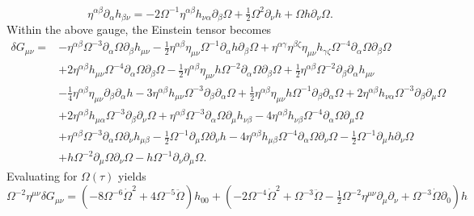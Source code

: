 \documentclass[10pt,letterpaper]{article}
\begin{document}
\begin{equation}
	\eta^{\alpha\beta}\partial_{\alpha}h_{\beta\nu} = -2 \Omega^{-1}  \eta^{\alpha\beta}h_{\nu\alpha}\partial_\beta \Omega + \tfrac12\Omega^2 \partial_\nu h +  \Omega h \partial_\nu \Omega.
\end{equation}
Within the above gauge, the Einstein tensor becomes
\begin{align}
\delta G_{\mu\nu}={}&- \eta^{\alpha \beta} \Omega^{-3} \partial_{\alpha}\Omega \partial_{\beta}h_{\mu \nu}
 -  \tfrac{1}{2} \eta^{\alpha \beta} \eta_{\mu \nu} \Omega^{-1} \partial_{\alpha}h \partial_{\beta}\Omega
 + \eta^{\alpha \gamma} \eta^{\beta \zeta} \eta_{\mu \nu} h_{\gamma \zeta} \Omega^{-4} \partial_{\alpha}\Omega \partial_{\beta}\Omega\nonumber\\
& + 2 \eta^{\alpha \beta} h_{\mu \nu} \Omega^{-4} \partial_{\alpha}\Omega \partial_{\beta}\Omega
 -  \tfrac{1}{2} \eta^{\alpha \beta} \eta_{\mu \nu} h \Omega^{-2} \partial_{\alpha}\Omega \partial_{\beta}\Omega
 + \tfrac{1}{2} \eta^{\alpha \beta} \Omega^{-2} \partial_{\beta}\partial_{\alpha}h_{\mu \nu}\nonumber\\
& -  \tfrac{1}{4} \eta^{\alpha \beta} \eta_{\mu \nu} \partial_{\beta}\partial_{\alpha}h
 - 3 \eta^{\alpha \beta} h_{\mu \nu} \Omega^{-3} \partial_{\beta}\partial_{\alpha}\Omega
 + \tfrac{1}{2} \eta^{\alpha \beta} \eta_{\mu \nu} h \Omega^{-1} \partial_{\beta}\partial_{\alpha}\Omega
 + 2 \eta^{\alpha \beta} h_{\nu \alpha} \Omega^{-3} \partial_{\beta}\partial_{\mu}\Omega\nonumber\\
& + 2 \eta^{\alpha \beta} h_{\mu \alpha} \Omega^{-3} \partial_{\beta}\partial_{\nu}\Omega
 + \eta^{\alpha \beta} \Omega^{-3} \partial_{\alpha}\Omega \partial_{\mu}h_{\nu \beta}
 - 4 \eta^{\alpha \beta} h_{\nu \beta} \Omega^{-4} \partial_{\alpha}\Omega \partial_{\mu}\Omega\nonumber\\
& + \eta^{\alpha \beta} \Omega^{-3} \partial_{\alpha}\Omega \partial_{\nu}h_{\mu \beta}
 -  \tfrac{1}{2} \Omega^{-1} \partial_{\mu}\Omega \partial_{\nu}h
 - 4 \eta^{\alpha \beta} h_{\mu \beta} \Omega^{-4} \partial_{\alpha}\Omega \partial_{\nu}\Omega
 -  \tfrac{1}{2} \Omega^{-1} \partial_{\mu}h \partial_{\nu}\Omega\nonumber\\
& + h \Omega^{-2} \partial_{\mu}\Omega \partial_{\nu}\Omega
 -  h \Omega^{-1} \partial_{\nu}\partial_{\mu}\Omega.
\end{align}
Evaluating for $\Omega(\tau)$ yields
\begin{equation}
	\Omega^{-2}\eta^{\mu\nu}\delta G_{\mu\nu}
=(-8 \Omega^{-6} \dot{\Omega}^2 + 4 \Omega^{-5} \ddot{\Omega}) h_{00} + (-2 \Omega^{-4} \dot{\Omega}^2 + \Omega^{-3} \ddot{\Omega} -  \tfrac{1}{2} \Omega^{-2} \eta^{\mu \nu} \partial_{\mu} \partial_{\nu} + \Omega^{-3} \dot{\Omega} \partial_{0}) h
\end{equation}
\end{document}
